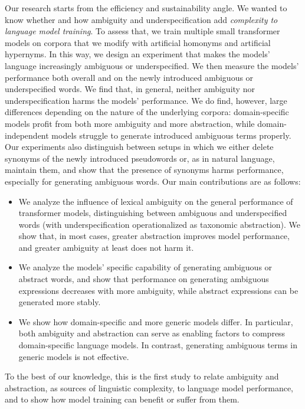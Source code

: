 \documentclass[final]{clv2025}
\begin{document}
Our research starts from the efficiency and sustainability angle. We wanted to know whether and how ambiguity and underspecification add \emph{complexity to language model training}. To assess that, we train multiple small transformer models on corpora that we modify with artificial homonyms and artificial hypernyms. In this way, we design an experiment that makes the models' language increasingly ambiguous or underspecified. We then measure the models' performance both overall and on the newly introduced ambiguous or underspecified words. We find that, in general, neither ambiguity nor underspecification harms the models' performance. We do find, however, large differences depending on the nature of the underlying corpora: domain-specific models profit from both more ambiguity and more abstraction, while domain-independent models struggle to generate introduced ambiguous terms properly. Our experiments also distinguish between setups in which we either delete synonyms of the newly introduced pseudowords or, as in natural language, maintain them, and show that the presence of synonyms harms performance, especially for generating ambiguous words.
Our main contributions are as follows:
\begin{itemize}
\item We analyze the influence of lexical ambiguity on the general performance of transformer models, distinguishing between ambiguous and underspecified words (with underspecification operationalized as taxonomic abstraction). We show that, in most cases, greater abstraction improves model performance, and greater ambiguity at least does not harm it.
\item We analyze the models' specific capability of generating ambiguous or abstract words, and show that performance on generating ambiguous expressions decreases with more ambiguity, while abstract expressions can be generated more stably.
\item We show how domain-specific and more generic models differ. In particular, both ambiguity and abstraction can serve as enabling factors to compress domain-specific language models. In contrast, generating ambiguous terms in generic models is not effective.
\end{itemize}
To the best of our knowledge, this is the first study to relate ambiguity and abstraction, as sources of linguistic complexity, to language model performance, and to show how model training can benefit or suffer from them.
\end{document}
